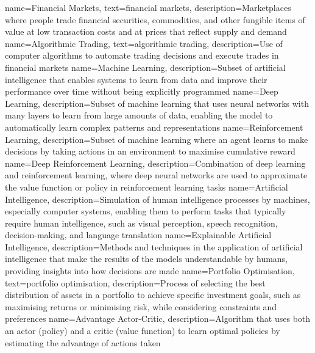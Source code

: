 {
    name=Financial Markets,
    text={financial markets},
    description={Marketplaces where people trade financial securities, commodities, and other fungible items of value at low transaction costs and at prices that reflect supply and demand}
}
{
    name=Algorithmic Trading,
    text={algorithmic trading},
    description={Use of computer algorithms to automate trading decisions and execute trades in financial markets}
}
{
    name=Machine Learning,
    description={Subset of artificial intelligence that enables systems to learn from data and improve their performance over time without being explicitly programmed}
}
{
    name=Deep Learning,
    description={Subset of machine learning that uses neural networks with many layers to learn from large amounts of data, enabling the model to automatically learn complex patterns and representations}
}
{
    name=Reinforcement Learning,
    description={Subset of machine learning where an agent learns to make decisions by taking actions in an environment to maximise cumulative reward}
}
{
    name=Deep Reinforcement Learning,
    description={Combination of deep learning and reinforcement learning, where deep neural networks are used to approximate the value function or policy in reinforcement learning tasks}
}
{
    name=Artificial Intelligence,
    description={Simulation of human intelligence processes by machines, especially computer systems, enabling them to perform tasks that typically require human intelligence, such as visual perception, speech recognition, decision-making, and language translation}
}
{
    name=Explainable Artificial Intelligence,
    description={Methods and techniques in the application of artificial intelligence that make the results of the models understandable by humans, providing insights into how decisions are made}
}
{
    name=Portfolio Optimisation,
    text={portfolio optimisation},
    description={Process of selecting the best distribution of assets in a portfolio to achieve specific investment goals, such as maximising returns or minimising risk, while considering constraints and preferences}
}
{
    name=Advantage Actor-Critic,
    description={Algorithm that uses both an actor (policy) and a critic (value function) to learn optimal policies by estimating the advantage of actions taken}
}
